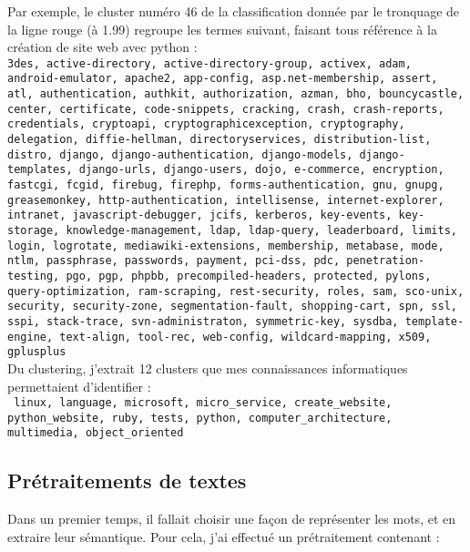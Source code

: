 \documentclass{article}
\begin{document}
Par exemple, le cluster numéro 46 de la classification donnée par le tronquage de la ligne rouge (à 1.99) regroupe les termes suivant, faisant tous référence à la création de site web avec python : \\
{\small \texttt{3des, active-directory, active-directory-group, activex, adam, android-emulator, apache2, app-config, asp.net-membership, assert, atl, authentication, authkit, authorization, azman, bho,  bouncycastle, center, certificate, code-snippets, cracking, crash,  crash-reports, credentials, cryptoapi, cryptographicexception,  cryptography, delegation, diffie-hellman, directoryservices,  distribution-list, distro, django, django-authentication,  django-models, django-templates, django-urls, django-users, dojo,  e-commerce, encryption, fastcgi, fcgid, firebug, firephp,  forms-authentication, gnu, gnupg, greasemonkey, http-authentication,  intellisense, internet-explorer, intranet, javascript-debugger,  jcifs, kerberos, key-events, key-storage, knowledge-management,  ldap, ldap-query, leaderboard, limits, login, logrotate,  mediawiki-extensions, membership, metabase, mode, ntlm, passphrase, passwords, payment, pci-dss, pdc, penetration-testing, pgo, pgp,  phpbb, precompiled-headers, protected, pylons, query-optimization,  ram-scraping, rest-security, roles, sam, sco-unix, security,  security-zone, segmentation-fault, shopping-cart, spn, ssl, sspi,  stack-trace, svn-administraton, symmetric-key, sysdba,  template-engine, text-align, tool-rec, web-config, wildcard-mapping,  x509, gplusplus}}\\

Du clustering, j'extrait 12 clusters que mes connaissances informatiques permettaient d'identifier : \\
{\small \texttt{ linux, language, microsoft, micro\_service, create\_website, python\_website, ruby, tests, python, computer\_architecture, multimedia, object\_oriented }}

\subsection{Prétraitements de textes}

Dans un premier temps, il fallait choisir une façon de représenter les mots, et en extraire leur sémantique. Pour cela, j'ai effectué un prétraitement contenant :\\
\end{document}
